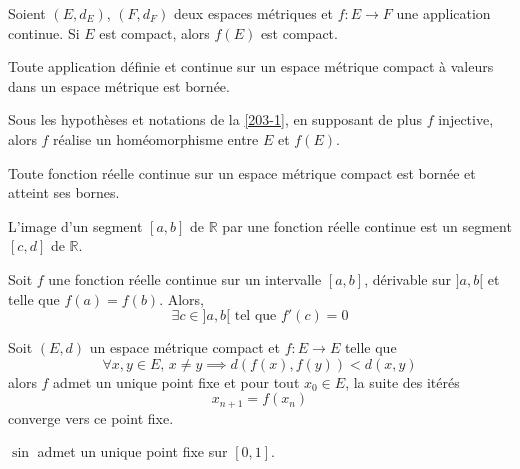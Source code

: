 
  \begin{proposition}
    \label{203-1}
    Soient $(E, d_E)$, $(F, d_F)$ deux espaces métriques et $f : E \rightarrow F$ une application continue. Si $E$ est compact, alors $f(E)$ est compact.
  \end{proposition}

  \begin{corollary}
    Toute application définie et continue sur un espace métrique compact à valeurs dans un espace métrique est bornée.
  \end{corollary}

  \begin{proposition}
    Sous les hypothèses et notations de la \cref{203-1}, en supposant de plus $f$ injective, alors $f$ réalise un homéomorphisme entre $E$ et $f(E)$.
  \end{proposition}

  \begin{theorem}
    Toute fonction réelle continue sur un espace métrique compact est bornée et atteint ses bornes.
  \end{theorem}

  \begin{corollary}
    L'image d'un segment $[a,b]$ de $\mathbb{R}$ par une fonction réelle continue est un segment $[c,d]$ de $\mathbb{R}$.
  \end{corollary}


  \begin{application}
    Soit $f$ une fonction réelle continue sur un intervalle $[a,b]$, dérivable sur $]a,b[$ et telle que $f(a) = f(b)$. Alors,
    \[ \exists c \in ]a,b[ \text{ tel que } f'(c) = 0 \]
  \end{application}


  \begin{application}
    Soit $(E,d)$ un espace métrique compact et $f : E \rightarrow E$ telle que
    \[ \forall x, y \in E, \, x \neq y \implies d(f(x), f(y)) < d(x,y) \]
    alors $f$ admet un unique point fixe et pour tout $x_0 \in E$, la suite des itérés
    \[ x_{n+1} = f(x_n) \]
    converge vers ce point fixe.
  \end{application}

  \begin{example}
    $\sin$ admet un unique point fixe sur $[0,1]$.
  \end{example}

